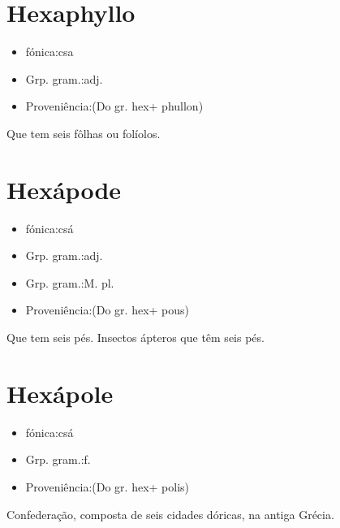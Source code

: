 \documentclass{article}
\begin{document}
\section{Hexaphyllo}
\begin{itemize}
\item {fónica:csa}
\end{itemize}
\begin{itemize}
\item {Grp. gram.:adj.}
\end{itemize}
\begin{itemize}
\item {Proveniência:(Do gr. \textunderscore hex\textunderscore  + \textunderscore phullon\textunderscore )}
\end{itemize}
Que tem seis fôlhas ou folíolos.
\section{Hexápode}
\begin{itemize}
\item {fónica:csá}
\end{itemize}
\begin{itemize}
\item {Grp. gram.:adj.}
\end{itemize}
\begin{itemize}
\item {Grp. gram.:M. pl.}
\end{itemize}
\begin{itemize}
\item {Proveniência:(Do gr. \textunderscore hex\textunderscore  + \textunderscore pous\textunderscore )}
\end{itemize}
Que tem seis pés.
Insectos ápteros que têm seis pés.
\section{Hexápole}
\begin{itemize}
\item {fónica:csá}
\end{itemize}
\begin{itemize}
\item {Grp. gram.:f.}
\end{itemize}
\begin{itemize}
\item {Proveniência:(Do gr. \textunderscore hex\textunderscore  + \textunderscore polis\textunderscore )}
\end{itemize}
Confederação, composta de seis cidades dóricas, na antiga Grécia.
\end{document}
